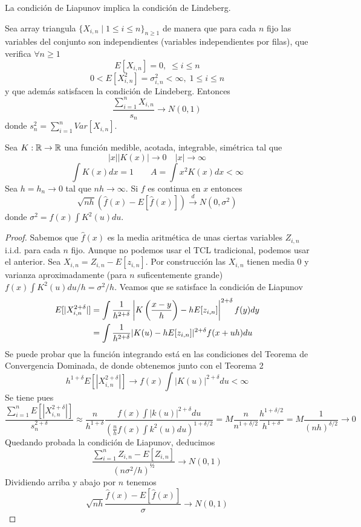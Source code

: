 \documentclass[MyPE.tex]{subfiles}
\begin{document}
\begin{prop}
La condición de Liapunov implica la condición de Lindeberg.
\end{prop}
\begin{prop}
Sea array triangula $\{X_{i,n}\mid 1\leq i \leq n\}_{n\geq 1}$ de manera que para cada $n$ fijo las variables del conjunto son independientes (variables independientes por filas), que verifica $\forall n \geq 1$
$$
E[X_{i,n}] = 0, \; \leq i \leq n 
$$
$$
0< E[X_{i,n}^2] = \sigma_{i,n}^2 < \infty, \; 1\leq i \leq n
$$
y que además satisfacen la condición de Lindeberg. Entonces 
$$
\frac{\sum_{i=1}^n X_{i,n}}{s_n} \to N(0,1)
$$
donde $s_n^2 = \sum_{i=1}^n Var[X_{i,n}]$.
\end{prop}
\setcounter{theorem}{4}
\begin{theorem}
Sea $K:\mathbb{R}\to\mathbb{R}$ una función medible, acotada, integrable, simétrica tal que
$$
|x||K(x)|\to 0 \quad |x|\to \infty 
$$
$$
\int K(x)dx = 1 \qquad A=\int x^2 K(x)dx <\infty
$$
Sea $h=h_n \to 0$ tal que $nh\to \infty$. Si $f$ es continua en $x$ entonces 
$$
\sqrt{nh}(\hat{f}(x)-E[\hat{f}(x)])\overset{d}{\longrightarrow}N(0,\sigma^2)
$$
donde $\sigma^2 = f(x)\int K^2(u)du$.
\end{theorem}
\begin{proof}
Sabemos que $\hat{f}(x)$ es la media aritmética de unas ciertas variables $Z_{i,n}$ i.i.d. para cada $n$ fijo. Aunque no podemos usar el TCL tradicional, podemos usar el anterior. Sea $X_{i,n} = Z_{i,n} - E[z_{i,n}]$.  Por construcción las $X_{i,n}$ tienen media $0$ y varianza aproximadamente (para $n$ suficentemente grande) $ f(x)\int K^2(u)du/h  = \sigma^2/h$. Veamos que se satisface la condición de Liapunov 
\begin{align*}
E[|X_{i,n}^{2+\delta}|] &= \int \frac{1}{h^{2+\delta}}\left\lvert K\left(\frac{x-y}{h}\right) - h E[z_{i,n}]\right\rvert^{2+\delta} f(y)dy \\
&= 
\int \frac{1}{h^{2+\delta}}|K(u) - h E[z_{i,n}]|^{2+\delta} f(x+uh)du 
\end{align*}
Se puede probar que la función integrando está en las condiciones del Teorema de Convergencia Dominada, de donde obtenemos junto con el Teorema 2
$$
h^{1+\delta}E[|X_{i,n}^{2+\delta}|] \to f(x)\int |K(u)|^{2+\delta}du < \infty
$$
Se tiene pues
$$
\frac{\sum_{i=1}^n E[|X_{i,n}^{2+\delta}|]}{s_n^{2+\delta}}  \approx \frac{n}{h^{1+\delta}} \frac{f(x)\int {|k(u)|^{2+\delta} du}}{(\frac{n}{h}f(x)\int k^2(u)du )^{1+\delta/2}} =
M \frac{n}{n^{1+\delta/2}} \frac{h^{1+\delta/2}}{h^{1+\delta}} = M \frac{1}{(nh)^{\delta/2}} \to 0
$$
Quedando probada la condición de Liapunov, deducimos
$$
\frac{\sum_{i=1}^n Z_{i,n}-E[Z_{i,n}]}{\left(n\sigma^2/h\right)^{½}} \to N(0,1)
$$
Dividiendo arriba y abajo por $n$ tenemos 
$$
\sqrt{nh} \frac{\hat{f}(x)-E[\hat{f}(x)]}{\sigma} \to N(0,1)
$$
\end{proof}
\end{document}

